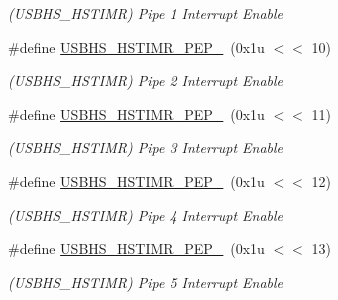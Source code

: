 \begin{DoxyCompactItemize}
\begin{DoxyCompactList}\small\item\em (U\+S\+B\+H\+S\+\_\+\+H\+S\+T\+I\+MR) Pipe 1 Interrupt Enable \end{DoxyCompactList}\item 
\mbox{\label{group__SAME70__USBHS_ga9880b7c54d692247c9aba7f4f95c2e15}} 
\#define \mbox{\hyperlink{group__SAME70__USBHS_ga9880b7c54d692247c9aba7f4f95c2e15}{U\+S\+B\+H\+S\+\_\+\+H\+S\+T\+I\+M\+R\+\_\+\+P\+E\+P\+\_}}~(0x1u $<$$<$ 10)
\begin{DoxyCompactList}\small\item\em (U\+S\+B\+H\+S\+\_\+\+H\+S\+T\+I\+MR) Pipe 2 Interrupt Enable \end{DoxyCompactList}\item 
\mbox{\label{group__SAME70__USBHS_ga70b559fada4c465d2b6bc299392ae540}} 
\#define \mbox{\hyperlink{group__SAME70__USBHS_ga70b559fada4c465d2b6bc299392ae540}{U\+S\+B\+H\+S\+\_\+\+H\+S\+T\+I\+M\+R\+\_\+\+P\+E\+P\+\_}}~(0x1u $<$$<$ 11)
\begin{DoxyCompactList}\small\item\em (U\+S\+B\+H\+S\+\_\+\+H\+S\+T\+I\+MR) Pipe 3 Interrupt Enable \end{DoxyCompactList}\item 
\mbox{\label{group__SAME70__USBHS_ga26cb041dc277bbef3b58e0202ab628f8}} 
\#define \mbox{\hyperlink{group__SAME70__USBHS_ga26cb041dc277bbef3b58e0202ab628f8}{U\+S\+B\+H\+S\+\_\+\+H\+S\+T\+I\+M\+R\+\_\+\+P\+E\+P\+\_}}~(0x1u $<$$<$ 12)
\begin{DoxyCompactList}\small\item\em (U\+S\+B\+H\+S\+\_\+\+H\+S\+T\+I\+MR) Pipe 4 Interrupt Enable \end{DoxyCompactList}\item 
\mbox{\label{group__SAME70__USBHS_gaceb5d8500512986ef44bafafe5f5aaa5}} 
\#define \mbox{\hyperlink{group__SAME70__USBHS_gaceb5d8500512986ef44bafafe5f5aaa5}{U\+S\+B\+H\+S\+\_\+\+H\+S\+T\+I\+M\+R\+\_\+\+P\+E\+P\+\_}}~(0x1u $<$$<$ 13)
\begin{DoxyCompactList}\small\item\em (U\+S\+B\+H\+S\+\_\+\+H\+S\+T\+I\+MR) Pipe 5 Interrupt Enable \end{DoxyCompactList}\item 

\end{DoxyCompactItemize}
